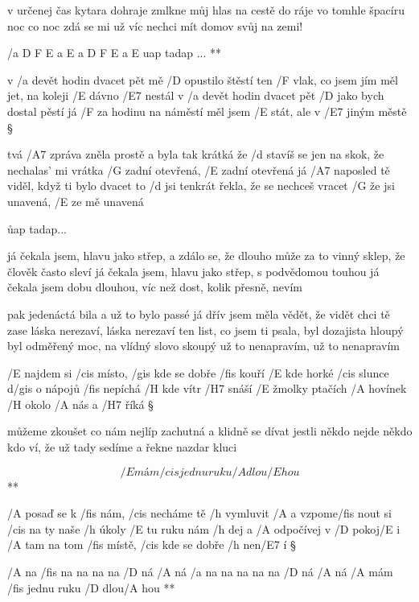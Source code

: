 v určenej čas kytara dohraje
zmlkne můj hlas na cestě do ráje
vo tomhle špacíru noc co noc zdá se mi
už víc nechci mít domov svůj na zemi!

\rr




\R  /{a D F E a E a D F E a E} uap tadap ... **

v /a devět hodin dvacet pět mě /D opustilo štěstí
ten /F vlak, co jsem jím měl jet, na koleji /E dávno /E7 nestál
v /a devět hodin dvacet pět /D jako bych dostal pěstí
já /F za hodinu na náměstí měl jsem /E stát, ale v /E7 jiným městě \S

tvá /A7 zpráva zněla prostě a byla tak krátká
že /d stavíš se jen na skok, že nechalas' mi vrátka
/G zadní otevřená, /E zadní otevřená
já /A7 naposled tě viděl, když ti bylo dvacet
to /d jsi tenkrát řekla, že se nechceš vracet
/G že jsi unavená, /E ze mě unavená

\r uap tadap...

já čekala jsem, hlavu jako střep, a zdálo se, že dlouho
může za to vinný sklep, že člověk často sleví
já čekala jsem, hlavu jako střep, s podvědomou touhou
já čekala jsem dobu dlouhou, víc než dost, kolik přesně, nevím \s

pak jedenáctá bila a už to bylo passé
já dřív jsem měla vědět, že vidět chci tě zase
láska nerezaví, láska nerezaví
ten list, co jsem ti psala, byl dozajista hloupý
byl odměřený moc, na vlídný slovo skoupý
už to nenapravím, už to nenapravím

\rr




/E najdem si /cis místo, /gis kde se dobře /fis kouří
/E kde horké /cis slunce d/gis o nápojů /fis nepíchá
/H kde vítr /H7 snáší /E žmolky ptačích /A hovínek
/H okolo /A nás a /H7 říká \S

můžeme zkoušet co nám nejlíp zachutná
a klidně se dívat jestli někdo nejde
někdo kdo ví, že už tady sedíme
a řekne nazdar kluci

\R  \[ /E mám /cis jednu ruku /A dlou/E hou \] **

/A posaď se k /fis nám, /cis necháme tě /h vymluvit
/A a vzpome/fis nout si /cis na ty naše /h úkoly
/E tu ruku nám /h dej a /A odpočívej v /D pokoj/E i
/A tam na tom /fis místě, /cis kde se dobře /h nen/E7 í \S

\R  /A na /fis na na na na /D ná /A ná 
    /a na na na na na /D ná /A ná
    /A mám /fis jednu ruku /D dlou/A hou  **



